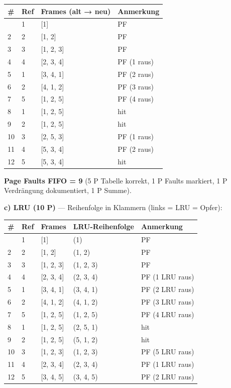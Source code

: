 \documentclass[11pt, a4paper]{article}
\begin{document}
{\small
\begin{tabularx}{\linewidth}{XXXX}
\hline
\rowcolor{tableheadbg}
{\color{white}\textbf{\#}} & {\color{white}\textbf{Ref}} & {\color{white}\textbf{Frames (alt → neu)}} & {\color{white}\textbf{Anmerkung}} \\[2pt]
\hline
\endhead
\hline
\endfoot
1 & 1 & [1] & PF \\
2 & 2 & [1, 2] & PF \\
3 & 3 & [1, 2, 3] & PF \\
4 & 4 & [2, 3, 4] & PF (1 raus) \\
5 & 1 & [3, 4, 1] & PF (2 raus) \\
6 & 2 & [4, 1, 2] & PF (3 raus) \\
7 & 5 & [1, 2, 5] & PF (4 raus) \\
8 & 1 & [1, 2, 5] & hit \\
9 & 2 & [1, 2, 5] & hit \\
10 & 3 & [2, 5, 3] & PF (1 raus) \\
11 & 4 & [5, 3, 4] & PF (2 raus) \\
12 & 5 & [5, 3, 4] & hit \\
\end{tabularx}
}


\textbf{Page Faults FIFO = 9} (5 P Tabelle korrekt, 1 P Faults markiert, 1 P Verdrängung dokumentiert, 1 P Summe).


\textbf{c) LRU (10 P)} — Reihenfolge in Klammern (links = LRU = Opfer):



{\small
\begin{tabularx}{\linewidth}{XXXXX}
\hline
\rowcolor{tableheadbg}
{\color{white}\textbf{\#}} & {\color{white}\textbf{Ref}} & {\color{white}\textbf{Frames}} & {\color{white}\textbf{LRU-Reihenfolge}} & {\color{white}\textbf{Anmerkung}} \\[2pt]
\hline
\endhead
\hline
\endfoot
1 & 1 & [1] & (1) & PF \\
2 & 2 & [1, 2] & (1, 2) & PF \\
3 & 3 & [1, 2, 3] & (1, 2, 3) & PF \\
4 & 4 & [2, 3, 4] & (2, 3, 4) & PF (1 LRU raus) \\
5 & 1 & [3, 4, 1] & (3, 4, 1) & PF (2 LRU raus) \\
6 & 2 & [4, 1, 2] & (4, 1, 2) & PF (3 LRU raus) \\
7 & 5 & [1, 2, 5] & (1, 2, 5) & PF (4 LRU raus) \\
8 & 1 & [1, 2, 5] & (2, 5, 1) & hit \\
9 & 2 & [1, 2, 5] & (5, 1, 2) & hit \\
10 & 3 & [1, 2, 3] & (1, 2, 3) & PF (5 LRU raus) \\
11 & 4 & [2, 3, 4] & (2, 3, 4) & PF (1 LRU raus) \\
12 & 5 & [3, 4, 5] & (3, 4, 5) & PF (2 LRU raus) \\
\end{tabularx}
}
\end{document}
